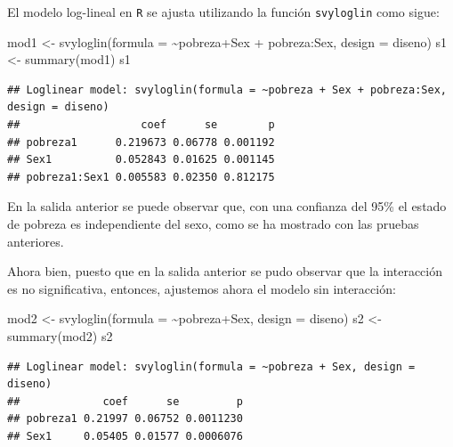 \documentclass[
  12pt,
]{book}
\newenvironment{Shaded}{\begin{snugshade}}{\end{snugshade}}
\newcommand{\AttributeTok}[1]{\textcolor[rgb]{0.77,0.63,0.00}{#1}}
\newcommand{\FunctionTok}[1]{\textcolor[rgb]{0.00,0.00,0.00}{#1}}
\newcommand{\NormalTok}[1]{#1}
\newcommand{\OtherTok}[1]{\textcolor[rgb]{0.56,0.35,0.01}{#1}}
\newcommand{\SpecialCharTok}[1]{\textcolor[rgb]{0.00,0.00,0.00}{#1}}
\begin{document}
El modelo log-lineal en \texttt{R} se ajusta utilizando la función \texttt{svyloglin} como sigue:

\begin{Shaded}
\begin{Highlighting}[]
\NormalTok{mod1 }\OtherTok{\textless{}{-}} \FunctionTok{svyloglin}\NormalTok{(}\AttributeTok{formula =} \SpecialCharTok{\textasciitilde{}}\NormalTok{pobreza}\SpecialCharTok{+}\NormalTok{Sex }\SpecialCharTok{+}\NormalTok{ pobreza}\SpecialCharTok{:}\NormalTok{Sex, }
                    \AttributeTok{design =}\NormalTok{ diseno)}
\NormalTok{s1 }\OtherTok{\textless{}{-}} \FunctionTok{summary}\NormalTok{(mod1)}
\NormalTok{s1}
\end{Highlighting}
\end{Shaded}

\begin{verbatim}
## Loglinear model: svyloglin(formula = ~pobreza + Sex + pobreza:Sex, design = diseno)
##                   coef      se        p
## pobreza1      0.219673 0.06778 0.001192
## Sex1          0.052843 0.01625 0.001145
## pobreza1:Sex1 0.005583 0.02350 0.812175
\end{verbatim}

En la salida anterior se puede observar que, con una confianza del 95\% el estado de pobreza es independiente del sexo, como se ha mostrado con las pruebas anteriores.

Ahora bien, puesto que en la salida anterior se pudo observar que la interacción es no significativa, entonces, ajustemos ahora el modelo sin interacción:

\begin{Shaded}
\begin{Highlighting}[]
\NormalTok{mod2 }\OtherTok{\textless{}{-}} \FunctionTok{svyloglin}\NormalTok{(}\AttributeTok{formula =} \SpecialCharTok{\textasciitilde{}}\NormalTok{pobreza}\SpecialCharTok{+}\NormalTok{Sex, }
                  \AttributeTok{design =}\NormalTok{ diseno)}
\NormalTok{s2 }\OtherTok{\textless{}{-}} \FunctionTok{summary}\NormalTok{(mod2)}
\NormalTok{s2}
\end{Highlighting}
\end{Shaded}

\begin{verbatim}
## Loglinear model: svyloglin(formula = ~pobreza + Sex, design = diseno)
##             coef      se         p
## pobreza1 0.21997 0.06752 0.0011230
## Sex1     0.05405 0.01577 0.0006076
\end{verbatim}
\end{document}
